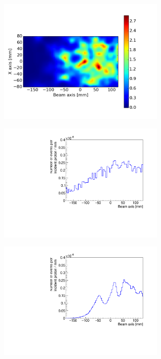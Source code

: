 \begin{figure}
\centering
 \begin{subfigure}[t]{.49\textwidth}
 \includegraphics[width=0.9\textwidth,clip=true,trim=0 70 130 90]{03_GraphicFiles/chapter4_HTsimu/new/recon_200pBunch/projection2D_Z_corr_r20.png}
 \caption{}
 \label{}
\end{subfigure}
 \begin{subfigure}[t]{.49\textwidth}
\includegraphics[width=0.9\textwidth]{03_GraphicFiles/chapter4_HTsimu/new/profile_lineCone_200pBunch.pdf}
 \caption{}
 \label{}
\end{subfigure}
 \begin{subfigure}[t]{.49\textwidth}
\includegraphics[width=0.9\textwidth]{03_GraphicFiles/chapter4_HTsimu/new/profile_MLEM_200pBunch.pdf}

\end{subfigure}
\end{figure}

